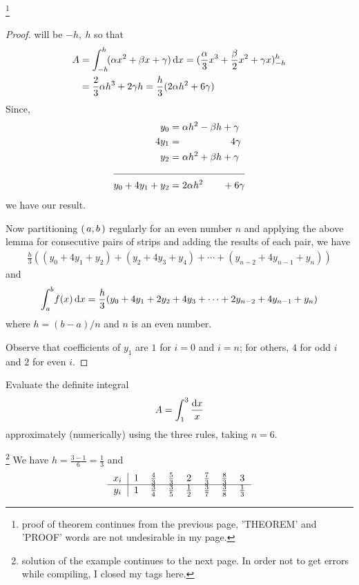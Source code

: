 \documentclass[11pt]{amsbook}
\begin{document}
\begin{thm}
	\footnote{proof of theorem continues from the previous page, 'THEOREM' and 'PROOF' words are not undesirable in my page.}
	\begin{proof}
		will be $-h,\:h$ so that
		\begin{align*}
			A &= \int_{-h}^{h} \! (\alpha x^{2} + \beta x + \gamma)\, \mathrm{d} x = (\frac{\alpha}{3}x^{3} + \frac{\beta}{2}x^{2} + \gamma x)_{-h}^{h} \\
			&= \frac{2}{3} \alpha h^{3} + 2 \gamma h = \frac{h}{3} (2 \alpha h^{2} + 6\gamma)
		\end{align*}
		Since,
		\begin{align*}
			y_{0} &= \alpha h^{2} - \beta h + \gamma \\
			4y_{1} &= \qquad\qquad\quad 4\gamma \\
			y_{2} &= \alpha h^{2} + \beta h + \gamma \\
			\cline{1-2}
			y_{0}+4y_{1}+y_{2} &= 2\alpha h^{2} \qquad +6\gamma
		\end{align*}
		we have our result.
		\par Now partitioning $ \left( \, a,b \, \right) $ regularly for an even number $n$ and applying the above lemma for consecutive pairs of strips and adding the results of each pair, we have
		\begin{align*}
			\frac{h}{3} ((y_{0}+4y_{1}+y_{2})+(y_{2}+4y_{3}+y_{4})+\cdots +(y_{n-2}+4y_{n-1}+y_{n}))
		\end{align*}
		and
		\begin{align*}
			\int_{a}^{b} \! f(x)\, \mathrm{d} x = \frac{h}{3}(y_{0}+4y_{1}+2y_{2}+4y_{3}+\cdots +2y_{n-2}+4y_{n-1}+y_{n})
		\end{align*}
		where $h=(b-a)/n$ and $n$ is an even number.
		\par Observe that coefficients of $y_{1}$ are $1$ for $i=0$ and $i=n$; for others, $4$ for odd $i$ and $2$ for even $i$.
	\end{proof}
\end{thm}

\begin{exmp}
	Evaluate the definite integral
	\begin{align*}
		A = \int_{1}^{3}\frac{\mathrm{d} x}{x}
	\end{align*}
	approximately (numerically) using the three rules, taking $n=6$.
	\begin{hSolution}
		\footnote{solution of the example continues to the next page. In order not to get errors while compiling, I closed my tags here.}
		We have $h=\frac{3-1}{6}=\frac{1}{3}$ and
		\begin{align*}
			\begin{tabular}{c|cccccccc|}
				$x_{i}$ & $1$ & $\frac{4}{3}$ & $\frac{5}{3}$ & $2$ & $\frac{7}{3}$ & $\frac{8}{3}$ & $3$ \\
				\hline
				$y_{i}$ & $1$ & $\frac{3}{4}$ & $\frac{3}{5}$ & $\frac{1}{2}$ & $\frac{3}{7}$ & $\frac{3}{8}$ & $\frac{1}{3}$
			\end{tabular}
		\end{align*}
	\end{hSolution}
\end{exmp}
\end{document}
